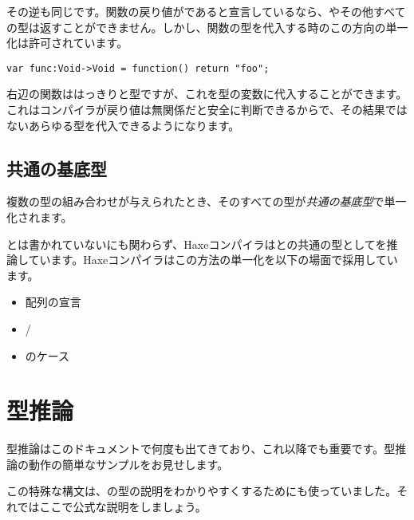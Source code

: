 その逆も同じです。関数の戻り値がであると宣言しているなら、やその他すべての型は返すことができません。しかし、関数の型を代入する時のこの方向の単一化は許可されています。

\begin{lstlisting}
var func:Void->Void = function() return "foo";
\end{lstlisting}

右辺の関数ははっきりと型ですが、これを型の変数に代入することができます。これはコンパイラが戻り値は無関係だと安全に判断できるからで、その結果ではないあらゆる型を代入できるようになります。

\subsection{共通の基底型}
\label{type-system-unification-common-base-type}

複数の型の組み合わせが与えられたとき、そのすべての型が\emph{共通の基底型}で単一化されます。


とは書かれていないにも関わらず、Haxeコンパイラはとの共通の型としてを推論しています。Haxeコンパイラはこの方法の単一化を以下の場面で採用しています。

\begin{itemize}
	\item 配列の宣言
	\item {}/
	\item {}のケース
\end{itemize}


\section{型推論}
\label{type-system-type-inference}

型推論はこのドキュメントで何度も出てきており、これ以降でも重要です。型推論の動作の簡単なサンプルをお見せします。


この特殊な構文は、の型の説明をわかりやすくするためにも使っていました。それではここで公式な説明をしましょう。


